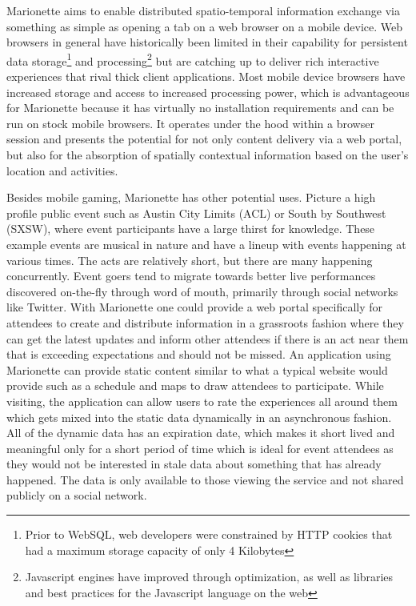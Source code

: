 \documentclass[12pt]{report}	%
\theoremstyle{definition}
\theoremstyle{remark}
\begin{document}
Marionette aims to enable distributed spatio-temporal information
exchange via something as simple as opening a tab on a web browser 
on a mobile device. Web browsers in general have
historically been limited in their capability for persistent data 
storage\footnote{Prior to WebSQL, web developers were constrained by 
HTTP cookies that had a maximum storage capacity of only 4 Kilobytes} 
and processing\footnote{Javascript engines have improved through optimization, as well as 
libraries and best practices for the Javascript language on the web} 
but are catching up to deliver rich interactive experiences
that rival thick client applications. Most mobile device browsers have
increased storage and access to increased processing power, which is 
advantageous for Marionette because it has virtually no installation 
requirements and can be run on stock mobile browsers. It operates under the hood
within a browser session and presents the potential for not only content
delivery via a web portal, but also for the absorption of spatially 
contextual information based on the user's location and activities.

Besides mobile gaming, Marionette has other potential uses. Picture a
high profile public event such as Austin City Limits (ACL) or South by
Southwest (SXSW), where event participants have a large thirst for
knowledge. These example events are musical in nature and have a lineup
with events happening at various times. The acts are relatively short,
but there are many happening concurrently. Event goers tend to migrate
towards better live performances discovered on-the-fly through word of mouth,
primarily through social networks like Twitter. With Marionette one
could provide a web portal specifically for attendees to create and distribute 
information in a grassroots
fashion where they can get the latest updates and inform other attendees
if there is an act near them that is exceeding expectations and should
not be missed. An application using Marionette can provide static content 
similar to what a typical website would provide such as a
schedule and maps to draw attendees to participate.  While visiting, the 
application can allow users to rate the experiences all around them which 
gets mixed into the static data dynamically in an asynchronous fashion. 
All of the dynamic data has an expiration date, which makes it
short lived and meaningful only for a short period of time which is ideal 
for event attendees as they would not be interested in stale data about 
something that has already happened. The data is
only available to those viewing the service and not shared publicly on a
social network.
\end{document}
